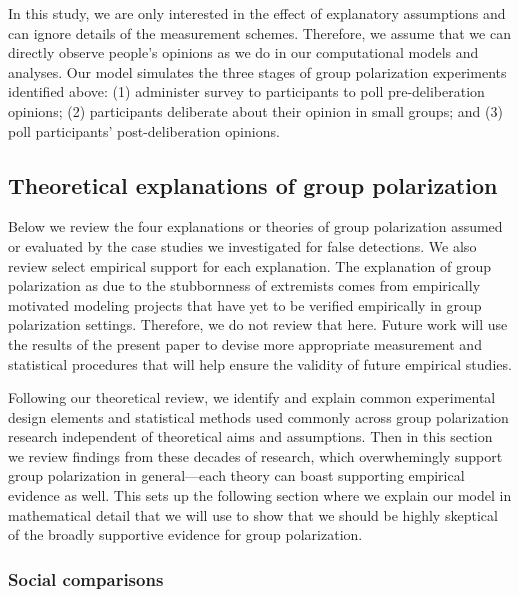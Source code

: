 In this study, we are only interested in the effect of explanatory assumptions
and can ignore details of the measurement schemes. Therefore, 
we assume that we can directly observe people's opinions as we do in our
computational models and analyses. Our model simulates the three stages
of group polarization experiments identified above: (1) administer survey
to participants to poll pre-deliberation opinions; (2) participants deliberate
about their opinion in small groups; and (3) poll participants' post-deliberation
opinions.


\subsection{Theoretical explanations of group polarization}

Below we review the four explanations or theories of group polarization 
assumed or evaluated by the case studies we investigated for false detections. 
We also review select empirical support for each explanation.
The explanation of group polarization as due to the stubbornness of 
extremists comes from empirically motivated modeling 
projects that have yet to be verified empirically in group polarization settings.
Therefore, we do not review that here. Future work will use the results of
the present paper to devise more appropriate measurement and statistical 
procedures that will help ensure the validity of future empirical studies.

Following our theoretical review, we identify and explain common experimental design
elements and statistical methods used commonly across group polarization research
independent of theoretical aims and assumptions. Then in this section
we review findings from these decades of research, which overwhemingly support 
group polarization in general---each theory can boast supporting empirical
evidence as well. This sets up the following section where
we explain our model in mathematical detail that we will use to
show that we should be highly skeptical of the broadly supportive evidence for group polarization. 

\subsubsection{Social comparisons}

